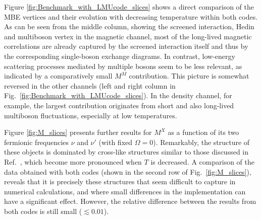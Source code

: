 \documentclass{SciPost}
\begin{document}
Figure \ref{fig:Benchmark_with_LMUcode_slices} shows a direct comparison of the MBE vertices and their evolution with decreasing temperature within both codes. As can be seen from the middle column, showing the screened interaction, Hedin and multiboson vertex in the magnetic channel, most of the long-lived magnetic correlations are already captured by the screened interaction itself and thus by the corresponding single-boson exchange diagrams. In contrast, low-energy scattering processes mediated by multiple bosons seem to be less relevant, as indicated by a comparatively small $M^M$ contribution. This picture is somewhat reversed in the other channels (left and right column in Fig.~\ref{fig:Benchmark_with_LMUcode_slices}). In the density channel, for example, the largest contribution originates from short and also long-lived multiboson fluctuations, especially at low temperatures. 

Figure \ref{fig:M_slices} presents further results for $M^X$ as a function of its two fermionic frequencies $\nu$ and $\nu'$ (with fixed $\Omega = 0$). Remarkably, the structure of these objects is dominated by cross-like structures similar to those discussed in Ref.~\cite{wentzell_high-frequency_2020}, which become more pronounced when $T$ is decreased. A comparison of the data obtained with both codes (shown in the second row of Fig.~\ref{fig:M_slices}), reveals that it is precisely these structures that seem difficult to capture in numerical calculations, and where small differences in the implementation can have a significant effect. However, the relative difference between the results from both codes is still small ($\lesssim 0.01$).
\end{document}
